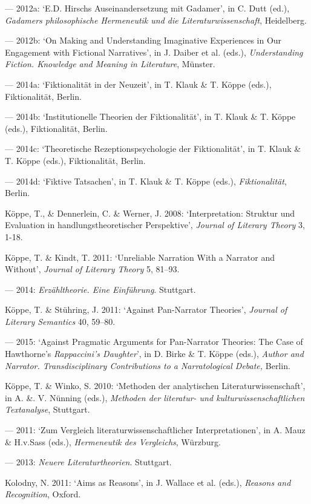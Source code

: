 \begin{hangparas}{.5cm}{1}
--- 2012a: `E.D. Hirschs Auseinandersetzung mit Gadamer', in C. Dutt (ed.), \emph{Gadamers philosophische Hermeneutik und die Literaturwissenschaft}, Heidelberg.

--- 2012b: `On Making and Understanding Imaginative Experiences in Our Engagement with Fictional Narratives', in J. Daiber et al. (eds.), \emph{Understanding Fiction. Knowledge and Meaning in Literature}, M\"unster.

--- 2014a: `Fiktionalit\"at in der Neuzeit', in T. Klauk \& T. K\"oppe (eds.), Fiktionalit\"at, Berlin.

--- 2014b: `Institutionelle Theorien der Fiktionalit\"at', in T. Klauk \& T. K\"oppe (eds.), Fiktionalit\"at, Berlin. 

--- 2014c: `Theoretische Rezeptionspsychologie der Fiktionalit\"at', in T. Klauk \& T. K\"oppe (eds.), Fiktionalit\"at, Berlin.

--- 2014d: `Fiktive Tatsachen', in T. Klauk \& T. K\"oppe (eds.), \emph{Fiktionalit\"at}, Berlin.

K\"oppe, T., \& Dennerlein, C. \& Werner, J. 2008: `Interpretation: Struktur und Evaluation in handlungstheoretischer Perspektive', \emph{Journal of Literary Theory} 3, 1-18.

K\"oppe, T. \& Kindt, T. 2011: `Unreliable Narration With a Narrator and Without', \emph{Journal of Literary Theory} 5, 81--93.

--- 2014: \emph{Erz\"ahltheorie. Eine Einf\"uhrung}. Stuttgart.

K\"oppe, T. \& St\"uhring, J. 2011: `Against Pan-Narrator Theories', \emph{Journal of Literary Semantics} 40, 59--80.

--- 2015: `Against Pragmatic Arguments for Pan-Narrator Theories: The Case of Hawthorne's \emph{Rappaccini's Daughter}', in D. Birke \& T. K\"oppe (eds.), \emph{Author and Narrator. Transdisciplinary Contributions to a Narratological Debate,} Berlin.

K\"oppe, T. \& Winko, S. 2010: `Methoden der analytischen Literaturwissenschaft', in A. \&. V. N\"unning (eds.), \emph{Methoden der literatur- und kulturwissenschaftlichen Textanalyse}, Stuttgart.

--- 2011: `Zum Vergleich literaturwissenschaftlicher Interpretationen', in A. Mauz \& H.v.Sass (eds.), \emph{Hermeneutik des Vergleichs}, W\"urzburg.

--- 2013: \emph{Neuere Literaturtheorien}. Stuttgart.

Kolodny, N. 2011: `Aims as Reasons', in J. Wallace et al. (eds.), \emph{Reasons and Recognition}, Oxford.


\end{hangparas}
